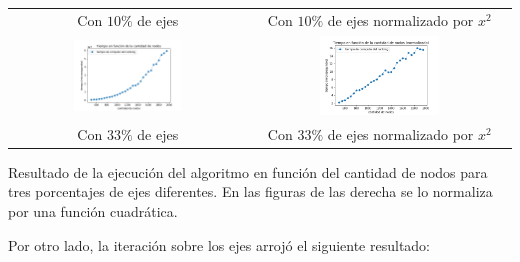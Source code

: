 \begin{minipage}{\textwidth}
\begin{center}
\begin{tabular}{cc}
             Con $10\%$ de ejes & Con $10\%$ de ejes normalizado por $x^{2}$ \\
      \includegraphics[width=0.475\textwidth]{img/tiempo_nodos_prop_500-2000_solo_e3.png} 
       & \includegraphics[width=0.475\textwidth]{img/tiempo_nodos_prop_500-2000-normalizado-e3.png} \\
             Con $33\%$ de ejes & Con $33\%$ de ejes normalizado por $x^{2}$ \\
                    \end{tabular}

                    \vspace{1em}

Resultado de la ejecución del algoritmo en función del cantidad de nodos para tres porcentajes de ejes diferentes. En las figuras de las derecha se lo normaliza por una función cuadrática.

                    \vspace{1em}
                \end{center}
                \label{fig:exp1-nodos}
            \end{minipage}




Por otro lado, la iteración sobre los ejes arrojó el siguiente resultado:

